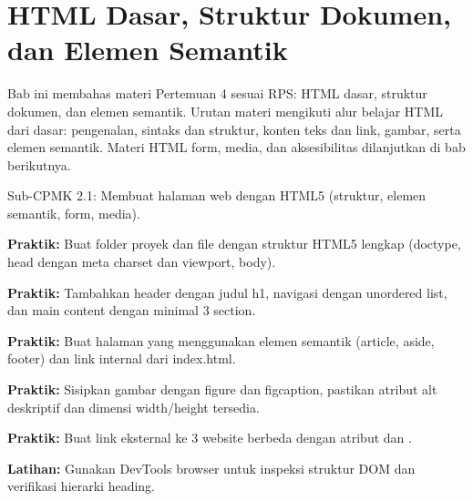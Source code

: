 \documentclass[../main.tex]{subfiles}
\begin{document}
\chapter{HTML Dasar, Struktur Dokumen, dan Elemen Semantik}

Bab ini membahas materi Pertemuan 4 sesuai RPS: HTML dasar, struktur dokumen, dan elemen semantik. Urutan materi mengikuti alur belajar HTML dari dasar: pengenalan, sintaks dan struktur, konten teks dan link, gambar, serta elemen semantik. Materi HTML form, media, dan aksesibilitas dilanjutkan di bab berikutnya.

\begin{subcpmk}
  \item Sub-CPMK 2.1: Membuat halaman web dengan HTML5 (struktur, elemen semantik, form, media).
\end{subcpmk}















\begin{aktivitas}
  \item \textbf{Praktik:} Buat folder proyek dan file  dengan struktur HTML5 lengkap (doctype, head dengan meta charset dan viewport, body).
  \item \textbf{Praktik:} Tambahkan header dengan judul h1, navigasi dengan unordered list, dan main content dengan minimal 3 section.
  \item \textbf{Praktik:} Buat halaman  yang menggunakan elemen semantik (article, aside, footer) dan link internal dari index.html.
  \item \textbf{Praktik:} Sisipkan gambar dengan figure dan figcaption, pastikan atribut alt deskriptif dan dimensi width/height tersedia.
  \item \textbf{Praktik:} Buat link eksternal ke 3 website berbeda dengan atribut  dan .
  \item \textbf{Latihan:} Gunakan DevTools browser untuk inspeksi struktur DOM dan verifikasi hierarki heading.
\end{aktivitas}
\end{document}
